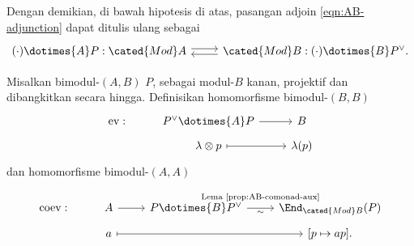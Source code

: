 Dengan demikian, di bawah hipotesis di atas, pasangan adjoin
\eqref{eqn:AB-adjunction} dapat ditulis ulang sebagai
\begin{equation}\label{eqn:AB-adjunction-2}\begin{tikzcd}
	(\cdot) \dotimes{A} P : \cated{Mod}A \arrow[shift left, r] & \cated{Mod}B: (\cdot) \dotimes{B} P^\vee . \arrow[shift left, l]
\end{tikzcd}\end{equation}

\begin{definition}\label{def:bimodule-ev-coev}
	Misalkan bimodul-$(A,B)$ $P$, sebagai modul-$B$ kanan, projektif dan
	dibangkitkan secara hingga. Definisikan homomorfisme bimodul-$(B,B)$
	\[\begin{tikzcd}[row sep=tiny]
		\mathrm{ev}: & P^\vee \dotimes{A} P \arrow[r] & B \\
		& \lambda \otimes p \arrow[mapsto, r] & \lambda(p)
	\end{tikzcd}\]
	dan homomorfisme bimodul-$(A,A)$
	\[\begin{tikzcd}[row sep=tiny]
		\mathrm{coev}: & A \arrow[r] & P \dotimes{B} P^\vee \arrow[r, "{\text{Lema \ref{prop:AB-comonad-aux}}}" inner sep=0.6em, "\sim"'] & \End_{\cated{Mod}B}(P) \\
		& a \arrow[mapsto, rr] & & {[p \mapsto ap]} .
	\end{tikzcd}\]
\end{definition}

